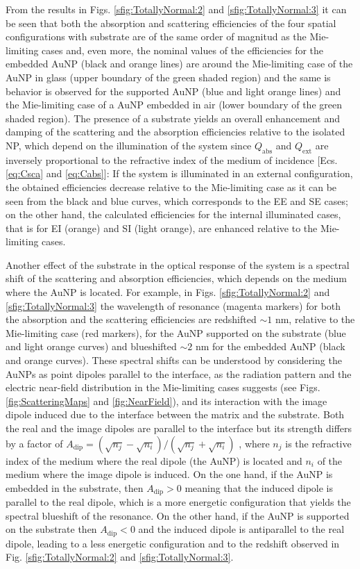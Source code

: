 From the results in Figs. \ref{sfig:TotallyNormal:2} and \ref{sfig:TotallyNormal:3} it can be seen that both the absorption and scattering efficiencies of the four spatial configurations with substrate are of the same order of magnitud as the Mie-limiting cases and, even more, the nominal values of the efficiencies for the embedded AuNP (black and orange lines) are around the Mie-limiting case of the AuNP in glass (upper boundary of the green shaded region) and the same is behavior is observed for the supported AuNP (blue and light orange lines) and the Mie-limiting case of a AuNP embedded in air (lower boundary of the green shaded region). The presence of a substrate yields an overall enhancement and damping of the scattering and the absorption efficiencies relative to the isolated NP, which depend on the illumination of the system since $Q_\text{abs}$ and $Q_\text{ext}$ are inversely proportional to the refractive index of the medium of incidence [Ecs. \eqref{eq:Csca} and \eqref{eq:Cabs}]: If the system is illuminated in an external configuration, the obtained efficiencies decrease relative to the Mie-limiting case as it can be seen from the black  and blue curves, which corresponds to the EE and SE cases; on the other hand, the calculated efficiencies for the internal illuminated cases, that is for EI (orange) and SI (light orange), are enhanced relative to the Mie-limiting cases.

Another effect of the substrate in the optical response of the system is a spectral shift of the scattering and absorption efficiencies, which depends on the medium where the AuNP is located. For example, in Figs. \ref{sfig:TotallyNormal:2} and \ref{sfig:TotallyNormal:3} the wavelength of resonance (magenta markers) for both the absorption and the scattering efficiencies are redshifted $\sim 1$ nm, relative to the Mie-limiting case (red markers), for the AuNP supported on the substrate (blue and light orange curves) and blueshifted $\sim 2$ nm for the embedded AuNP (black and orange curves). These spectral shifts can be understood by considering the AuNPs as point dipoles parallel to the interface, as the radiation pattern and the electric near-field distribution in the Mie-limiting cases suggests (see Figs. \ref{fig:ScatteringMaps} and  \ref{fig:NearField}), and its interaction with the image dipole induced due to the interface between the matrix and the substrate. Both the real and the image dipoles are parallel to the interface but its strength differs by  a factor of $A_\text{dip} = (\sqrt{n_j}-\sqrt{n_i}) / (\sqrt{n_j}+\sqrt{n_i})$ \cite{barrera1991optical}, where $n_{j}$ is the refractive index of the medium where the real dipole (the AuNP) is located and $n_i$ of the medium where the image dipole is induced. On the one hand, if the AuNP is embedded in the substrate, then $A_\text{dip}>0$ meaning that the induced dipole is parallel to the real dipole, which is a more energetic configuration that yields the spectral blueshift of the resonance. On the other hand, if the AuNP is supported on the substrate then $A_\text{dip}<0$ and the induced dipole is antiparallel to the real dipole, leading to a less energetic configuration and to the redshift observed in Fig. \ref{sfig:TotallyNormal:2} and \ref{sfig:TotallyNormal:3}.%

